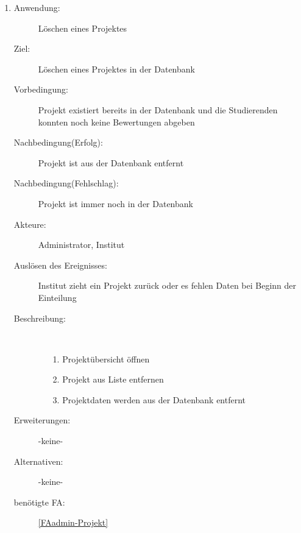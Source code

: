 \documentclass[parskip=full]{scrartcl}
\newcommand{\swtLabel}[1]{\textbf{/#1\arabic*0/}}
\begin{document}
\begin{enumerate} [label=\swtLabel{A}]
  
  \item
  \begin{description}
  \item[Anwendung:] Löschen eines Projektes
  \item[Ziel:] Löschen eines Projektes in der Datenbank
  	\item[Vorbedingung:] Projekt existiert bereits in der Datenbank und die
  	Studierenden konnten noch keine Bewertungen abgeben
  	\item[Nachbedingung(Erfolg):] Projekt ist aus der Datenbank entfernt
  	\item[Nachbedingung(Fehlschlag):] Projekt ist immer noch in der Datenbank
  	\item[Akteure:] Administrator, Institut %
  	\item[Auslösen des Ereignisses:] Institut zieht ein Projekt zurück oder es
  	fehlen Daten bei Beginn der Einteilung
  	\item[Beschreibung:]~
  	\begin{enumerate} 
  	  \item[1.] Projektübersicht öffnen
  	  \item[2.] Projekt aus Liste entfernen
  	  \item[3.] Projektdaten werden aus der Datenbank entfernt
  	\end{enumerate}
  	\item[Erweiterungen:] -keine-
  	\item[Alternativen:] -keine-
  	\item[benötigte FA:] \ref{FAadmin-Projekt}
  \end{description}
   

\end{enumerate}
\end{document}

